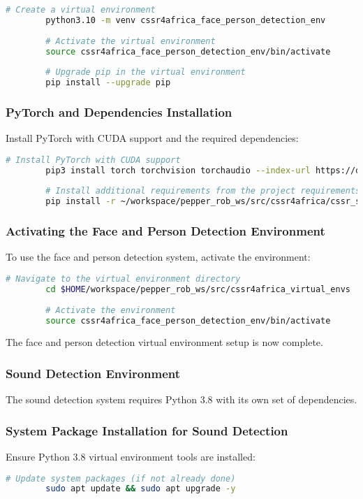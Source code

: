 \documentclass{CSSRforAfrica}
\begin{document}
{\begin{lstlisting}[style=withoutNumbering, language=bash]
		# Create a virtual environment
		python3.10 -m venv cssr4africa_face_person_detection_env
		
		# Activate the virtual environment
		source cssr4africa_face_person_detection_env/bin/activate
		
		# Upgrade pip in the virtual environment
		pip install --upgrade pip
		\end{lstlisting}
		
		\subsubsection*{PyTorch and Dependencies Installation}
		Install PyTorch with CUDA support and the required dependencies:
		\begin{lstlisting}[style=withoutNumbering, language=bash]
		# Install PyTorch with CUDA support
		pip3 install torch torchvision torchaudio --index-url https://download.pytorch.org/whl/cu118
		
		# Install additional requirements from the project requirements file
		pip install -r ~/workspace/pepper_rob_ws/src/cssr4africa/cssr_system/face_detection/face_detection_requirements_x86.txt
		\end{lstlisting}
		
		\subsubsection*{Activating the Face and Person Detection Environment}
		To use the face and person detection system, activate the environment:
		\begin{lstlisting}[style=withoutNumbering, language=bash]
		# Navigate to the virtual environment directory
		cd $HOME/workspace/pepper_rob_ws/src/cssr4africa_virtual_envs
		
		# Activate the environment
		source cssr4africa_face_person_detection_env/bin/activate
		\end{lstlisting}
		
		The face and person detection virtual environment setup is now complete.
		
		\subsubsection*{Sound Detection Environment}
		The sound detection system requires Python 3.8 with its own set of dependencies.
		
		\subsubsection*{System Package Installation for Sound Detection}
		Ensure Python 3.8 virtual environment tools are installed:
		\begin{lstlisting}[style=withoutNumbering, language=bash]
		# Update system packages (if not already done)
		sudo apt update && sudo apt upgrade -y
		

\end{lstlisting}}
\end{document}
